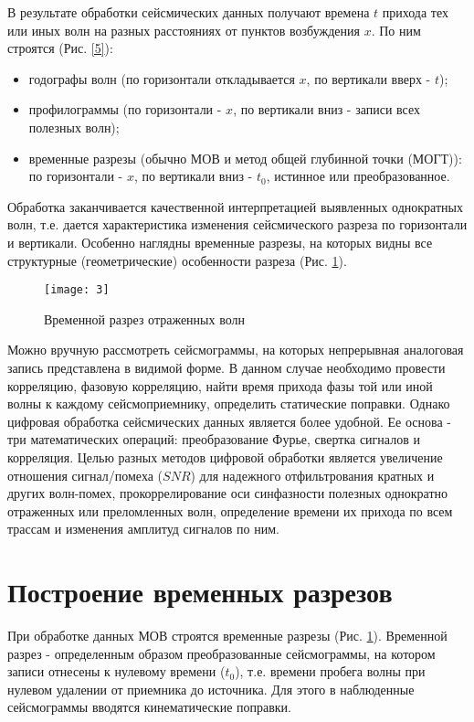 В результате обработки сейсмических данных получают времена $t$ прихода тех или иных волн на разных расстояниях от пунктов возбуждения $x$. По ним строятся (Рис. \ref{5}):
\begin{itemize}
	\item годографы волн (по горизонтали откладывается $x$, по вертикали вверх - $t$);
	\item профилограммы (по горизонтали - $x$, по вертикали вниз - записи всех полезных волн);
	\item временные разрезы (обычно МОВ и метод общей глубинной точки (МОГТ)): по горизонтали - $x$, по вертикали вниз - $t_0$, истинное или преобразованное.
\end{itemize}
Обработка заканчивается качественной интерпретацией выявленных однократных волн, т.е. дается характеристика изменения сейсмического разреза по горизонтали и вертикали. Особенно наглядны временные разрезы, на которых видны все структурные (геометрические) особенности разреза (Рис. \ref{3}).

\begin{figure}[H]
	\centering
	\texttt{[image: 3]}
	\caption{Временной разрез отраженных волн}
	\label{3}
\end{figure}



Можно вручную рассмотреть сейсмограммы, на которых непрерывная аналоговая запись представлена в видимой форме. В данном случае необходимо провести корреляцию, фазовую корреляцию, найти время прихода фазы той или иной волны к каждому сейсмоприемнику, определить статические поправки. Однако цифровая обработка сейсмических данных является более удобной. Ее основа - три математических операций: преобразование Фурье, свертка сигналов и корреляция. Целью разных методов цифровой обработки является увеличение отношения сигнал/помеха ($SNR$) для надежного отфильтрования кратных и других волн-помех, прокоррелирование оси синфазности полезных однократно отраженных или преломленных волн, определение времени их прихода по всем трассам и изменения амплитуд сигналов по ним.

\section*{Построение временных разрезов}

При обработке данных МОВ строятся временные разрезы (Рис. \ref{3}). Временной разрез - определенным образом преобразованные сейсмограммы, на котором записи отнесены к нулевому времени ($t_0$), т.е. времени пробега волны при нулевом удалении от приемника до источника. Для этого в наблюденные сейсмограммы вводятся кинематические поправки.

